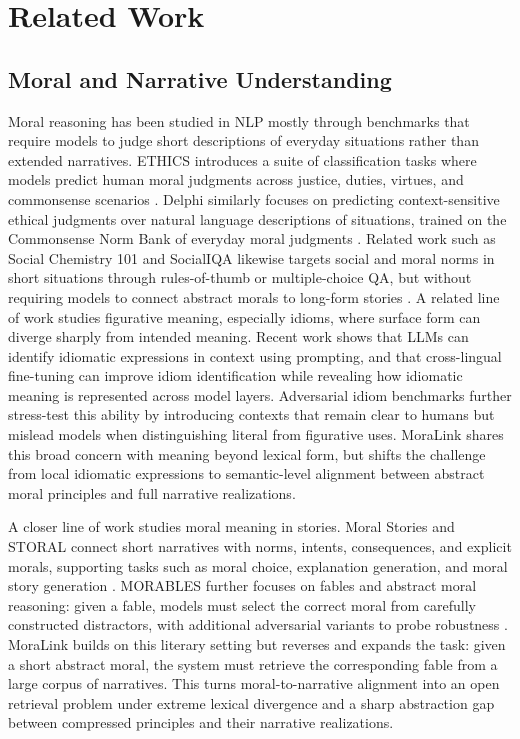 \documentclass[11pt]{article}
\begin{document}
\section{Related Work}
\label{sec:related-work}

\subsection{Moral and Narrative Understanding}
Moral reasoning has been studied in NLP mostly through benchmarks that require models to judge short descriptions of everyday situations rather than extended narratives. ETHICS introduces a suite of classification tasks where models predict human moral judgments across justice, duties, virtues, and commonsense scenarios \citep{hendrycks2020aligning}. Delphi similarly focuses on predicting context-sensitive ethical judgments over natural language descriptions of situations, trained on the Commonsense Norm Bank of everyday moral judgments \citep{jiang2021delphi}. Related work such as Social Chemistry 101 and SocialIQA likewise targets social and moral norms in short situations through rules-of-thumb or multiple-choice QA, but without requiring models to connect abstract morals to long-form stories \citep{forbes-etal-2020-social,sap-etal-2019-social}.
A related line of work studies figurative meaning, especially idioms, where surface form can diverge sharply from intended meaning. Recent work shows that LLMs can identify idiomatic expressions in context using prompting, and that cross-lingual fine-tuning can improve idiom identification while revealing how idiomatic meaning is represented across model layers. Adversarial idiom benchmarks further stress-test this ability by introducing contexts that remain clear to humans but mislead models when distinguishing literal from figurative uses. MoraLink shares this broad concern with meaning beyond lexical form, but shifts the challenge from local idiomatic expressions to semantic-level alignment between abstract moral principles and full narrative realizations.

A closer line of work studies moral meaning in stories. Moral Stories and STORAL connect short narratives with norms, intents, consequences, and explicit morals, supporting tasks such as moral choice, explanation generation, and moral story generation \citep{emelin-etal-2021-moral,guan-etal-2022-corpus}. MORABLES
further focuses on fables and abstract moral reasoning: given a fable, models must select the correct moral from carefully constructed distractors, with additional adversarial variants to probe robustness
\citep{marcuzzo-etal-2025-morables}. MoraLink builds on this literary setting but reverses and expands the task: given a short abstract moral, the system must retrieve the corresponding fable from a large corpus of narratives. This turns moral-to-narrative alignment into an open retrieval problem under extreme lexical divergence and a sharp abstraction gap between compressed principles and their narrative realizations.
\end{document}
